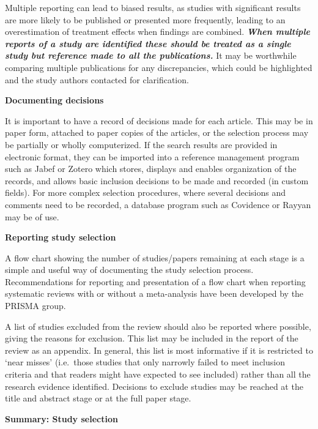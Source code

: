 \documentclass[
  10pt,
  a4paper,
  DIV=11,
  numbers=noendperiod]{scrreprt}
\begin{document}
Multiple reporting can lead to biased results, as studies with
significant results are more likely to be published or presented more
frequently, leading to an overestimation of treatment effects when
findings are combined. \textbf{\emph{When multiple reports of a study
are identified these should be treated as a single study but reference
made to all the publications.}} It may be worthwhile comparing multiple
publications for any discrepancies, which could be highlighted and the
study authors contacted for clarification.

\textbf{Documenting decisions}

It is important to have a record of decisions made for each article.
This may be in paper form, attached to paper copies of the articles, or
the selection process may be partially or wholly computerized. If the
search results are provided in electronic format, they can be imported
into a reference management program such as Jabef or Zotero which
stores, displays and enables organization of the records, and allows
basic inclusion decisions to be made and recorded (in custom fields).
For more complex selection procedures, where several decisions and
comments need to be recorded, a database program such as Covidence or
Rayyan may be of use.

\textbf{Reporting study selection}

A flow chart showing the number of studies/papers remaining at each
stage is a simple and useful way of documenting the study selection
process. Recommendations for reporting and presentation of a flow chart
when reporting systematic reviews with or without a meta-analysis have
been developed by the PRISMA group.

A list of studies excluded from the review should also be reported where
possible, giving the reasons for exclusion. This list may be included in
the report of the review as an appendix. In general, this list is most
informative if it is restricted to `near misses' (i.e.~those studies
that only narrowly failed to meet inclusion criteria and that readers
might have expected to see included) rather than all the research
evidence identified. Decisions to exclude studies may be reached at the
title and abstract stage or at the full paper stage.

\textbf{Summary: Study selection}
\end{document}
